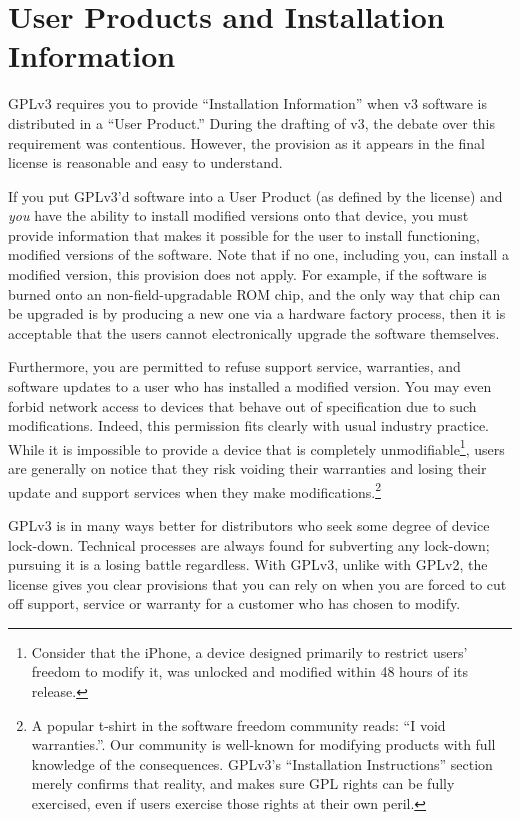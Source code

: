 \section{User Products and Installation Information}
\label{user-products}

GPLv3 requires you to provide ``Installation Information'' when v3
software is distributed in a ``User Product.''  During the drafting of v3,
the debate over this requirement was contentious.  However, the provision
as it appears in the final license is reasonable and easy to understand.

If you put GPLv3'd software into a User Product (as defined by the
license) and \emph{you} have the ability to install modified versions onto
that device, you must provide information that makes it possible for the
user to install functioning, modified versions of the software.  Note that
if no one, including you, can install a modified version, this provision
does not apply.  For example, if the software is burned onto an
non-field-upgradable ROM chip, and the only way that chip can be upgraded
is by producing a new one via a hardware factory process, then it is
acceptable that the users cannot electronically upgrade the software
themselves.

Furthermore, you are permitted to refuse support service, warranties, and
software updates to a user who has installed a modified version.  You may
even forbid network access to devices that behave out of specification due
to such modifications.  Indeed, this permission fits clearly with usual
industry practice.  While it is impossible to provide a device that is
completely unmodifiable\footnote{Consider that the iPhone, a device
  designed primarily to restrict users' freedom to modify it, was unlocked
  and modified within 48 hours of its release.}, users are generally on
notice that they risk voiding their warranties and losing their update and
support services when they make modifications.\footnote{A popular t-shirt
  in the software freedom community reads: ``I void warranties.''.  Our community is
  well-known for modifying products with full knowledge of the
  consequences.  GPLv3's ``Installation Instructions'' section merely
  confirms that reality, and makes sure GPL rights can be fully exercised,
  even if users exercise those rights at their own peril.}

GPLv3 is in many ways better for distributors who seek some degree of
device lock-down.  Technical processes are always found for subverting any
lock-down; pursuing it is a losing battle regardless.  With GPLv3, unlike
with GPLv2, the license gives you clear provisions that you can rely on
when you are forced to cut off support, service or warranty for a customer
who has chosen to modify.

